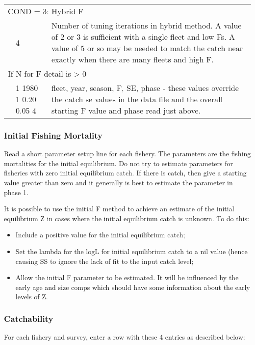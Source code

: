 \begin{center}
\begin{longtable}{p{1cm} p{3cm} p{11cm}}
		   \multicolumn{3}{l}{COND = 3: Hybrid F}\\
		   & 4 & Number of tuning iterations in hybrid method. A value of 2 or 3 is sufficient with a single fleet and low Fs.  A value of 5 or so may be needed to match the catch near exactly when there are many fleets and high F. \\
		   \hline
		   \multicolumn{3}{l}{If N for F detail is > 0}\\
		   & 1 1980 1 0.20 0.05 4 & fleet, year, season, F, SE, phase - these values override the catch se values in the data file and the overall starting F value and phase read just above.\\
		   \hline
	\end{longtable}
\end{center}

\subsubsection{Initial Fishing Mortality}
Read a short parameter setup line for each fishery.  The parameters are the fishing mortalities for the initial equilibrium.  Do not try to estimate parameters for fisheries with zero initial equilibrium catch.  If there is catch, then give a starting value greater than zero and it generally is best to estimate the parameter in phase 1.

It is possible to use the initial F method to achieve an estimate of the initial equilibrium Z in cases where the initial equilibrium catch is unknown.  To do this:
\begin{itemize}
	\item Include a positive value for the initial equilibrium catch;
	\item Set the lambda for the logL for initial equilibrium catch to a nil value (hence causing SS to ignore the lack of fit to the input catch level;
	\item Allow the initial F parameter to be estimated.  It will be influenced by the early age and size comps which should have some information about the early levels of Z.
\end{itemize}

\hypertarget{Qsetup}{}
\subsubsection{Catchability}
For each fishery and survey, enter a row with these 4 entries as described below:

